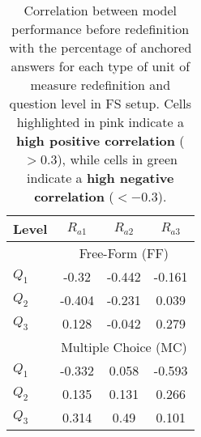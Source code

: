 \begin{table}[h!]
\small
    \centering
    \begin{tabular}{l|ccc}
        \hline
        Level & $R_{a1}$ & $R_{a2}$ & $R_{a3}$ \\ \hline
        & \multicolumn{3}{c}{Free-Form (FF)} \\ 
        \hline
        $Q_1$ & \cellcolor{lightdustygreen} -0.32 & \cellcolor{lightdustygreen} -0.442 & -0.161 \\
        $Q_2$ & \cellcolor{lightdustygreen} -0.404 & -0.231 & 0.039 \\
        $Q_3$ & 0.128 & -0.042 & 0.279 \\
        
        \hline
                & \multicolumn{3}{c}{Multiple Choice (MC)} \\ \hline

                
$Q_1$ & \cellcolor{lightdustygreen} -0.332 & 0.058 & \cellcolor{lightdustygreen} -0.593 \\
$Q_2$ & 0.135 & 0.131 & 0.266 \\
$Q_3$ & \cellcolor{lightdustypink} 0.314 & \cellcolor{lightdustypink} 0.49 & 0.101 \\

        \hline
    \end{tabular}
    \caption{Correlation between model performance before redefinition with the percentage of anchored answers for each type of unit of measure redefinition and question level in FS setup. 
    Cells highlighted in \textcolor{lightdustypink}{pink} indicate a \textbf{high positive correlation} ($>0.3$), while cells in \textcolor{lightdustygreen}{green} indicate a \textbf{high negative correlation} ($<-0.3$).}
    \label{tab:correlation_fs-units}
\end{table}



